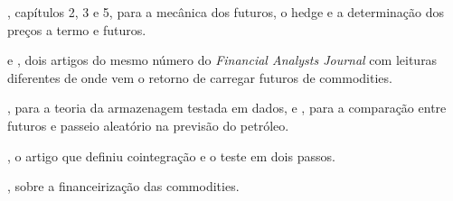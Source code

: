 \begin{leituras}
  \item \citet{hull2022}, capítulos 2, 3 e 5, para a mecânica dos futuros, o hedge e a determinação dos preços a termo e futuros.
  \item \citet{gorton2006} e \citet{erb2006}, dois artigos do mesmo número do \emph{Financial Analysts Journal} com leituras diferentes de onde vem o retorno de carregar futuros de commodities.
  \item \citet{fama1987}, para a teoria da armazenagem testada em dados, e \citet{alquist2010}, para a comparação entre futuros e passeio aleatório na previsão do petróleo.
  \item \citet{engle1987}, o artigo que definiu cointegração e o teste em dois passos.
  \item \citet{tang2012}, sobre a financeirização das commodities.
\end{leituras}
